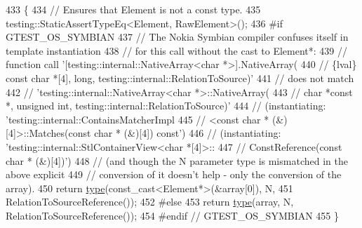 \begin{DoxyCode}
433                                                                    \{
434     \textcolor{comment}{// Ensures that Element is not a const type.}
435     testing::StaticAssertTypeEq<Element, RawElement>();
436 \textcolor{preprocessor}{#if GTEST\_OS\_SYMBIAN}
437     \textcolor{comment}{// The Nokia Symbian compiler confuses itself in template instantiation}
438     \textcolor{comment}{// for this call without the cast to Element*:}
439     \textcolor{comment}{// function call '[testing::internal::NativeArray<char *>].NativeArray(}
440     \textcolor{comment}{//     \{lval\} const char *[4], long, testing::internal::RelationToSource)'}
441     \textcolor{comment}{//     does not match}
442     \textcolor{comment}{// 'testing::internal::NativeArray<char *>::NativeArray(}
443     \textcolor{comment}{//     char *const *, unsigned int, testing::internal::RelationToSource)'}
444     \textcolor{comment}{// (instantiating: 'testing::internal::ContainsMatcherImpl}
445     \textcolor{comment}{//     <const char * (&)[4]>::Matches(const char * (&)[4]) const')}
446     \textcolor{comment}{// (instantiating: 'testing::internal::StlContainerView<char *[4]>::}
447     \textcolor{comment}{//     ConstReference(const char * (&)[4])')}
448     \textcolor{comment}{// (and though the N parameter type is mismatched in the above explicit}
449     \textcolor{comment}{// conversion of it doesn't help - only the conversion of the array).}
450     \textcolor{keywordflow}{return} \hyperlink{classtesting_1_1internal_1_1StlContainerView_3_01Element[N]_4_a364efca99cc5a02829b4e3413c506b09}{type}(const\_cast<Element*>(&array[0]), N,
451                 RelationToSourceReference());
452 \textcolor{preprocessor}{#else}
453     \textcolor{keywordflow}{return} \hyperlink{classtesting_1_1internal_1_1StlContainerView_3_01Element[N]_4_a364efca99cc5a02829b4e3413c506b09}{type}(array, N, RelationToSourceReference());
454 \textcolor{preprocessor}{#endif  // GTEST\_OS\_SYMBIAN}
455   \}
\end{DoxyCode}
\mbox{\label{classtesting_1_1internal_1_1StlContainerView_3_01Element[N]_4_af2cf79fbd7f829229a47b52f863c68f8}} 
